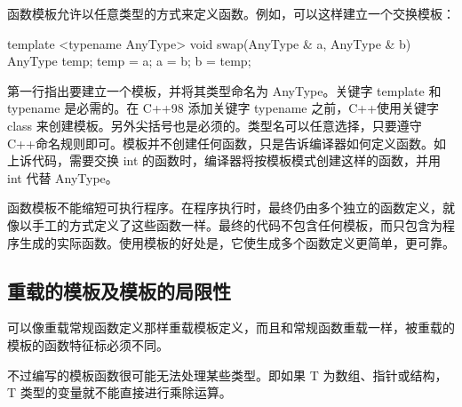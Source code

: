 函数模板允许以任意类型的方式来定义函数。例如，可以这样建立一个交换模板：
\begin{ccode}
template <typename AnyType>
void swap(AnyType & a, AnyType & b)
{
	AnyType temp;
	temp = a;
	a = b;
	b = temp;
}
\end{ccode}
第一行指出要建立一个模板，并将其类型命名为 AnyType。关键字 template 和 typename 是必需的。在 C++98 添加关键字 typename 之前，C++使用关键字 class 来创建模板。另外尖括号也是必须的。类型名可以任意选择，只要遵守 C++命名规则即可。模板并不创建任何函数，只是告诉编译器如何定义函数。如上诉代码，需要交换 int 的函数时，编译器将按模板模式创建这样的函数，并用 int 代替 AnyType。
\begin{marker}
函数模板不能缩短可执行程序。在程序执行时，最终仍由多个独立的函数定义，就像以手工的方式定义了这些函数一样。最终的代码不包含任何模板，而只包含为程序生成的实际函数。使用模板的好处是，它使生成多个函数定义更简单，更可靠。
\end{marker}
\subsection{重载的模板及模板的局限性}
可以像重载常规函数定义那样重载模板定义，而且和常规函数重载一样，被重载的模板的函数特征标必须不同。

不过编写的模板函数很可能无法处理某些类型。即如果 T 为数组、指针或结构，T 类型的变量就不能直接进行乘除运算。